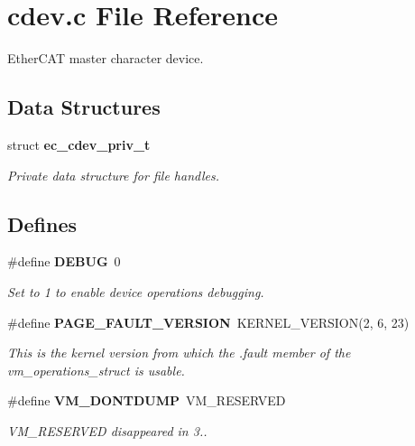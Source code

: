 \section{cdev.\-c \-File \-Reference}
\label{cdev_8c}


\-Ether\-C\-A\-T master character device.  


\subsection*{\-Data \-Structures}
\begin{DoxyCompactItemize}
\item 
struct {\bf ec\-\_\-cdev\-\_\-priv\-\_\-t}
\begin{DoxyCompactList}\small\item\em \-Private data structure for file handles. \end{DoxyCompactList}\end{DoxyCompactItemize}
\subsection*{\-Defines}
\begin{DoxyCompactItemize}
\item 
\#define {\bf \-D\-E\-B\-U\-G}~0\label{cdev_8c_ad72dbcf6d0153db1b8d8a58001feed83}

\begin{DoxyCompactList}\small\item\em \-Set to 1 to enable device operations debugging. \end{DoxyCompactList}\item 
\#define {\bf \-P\-A\-G\-E\-\_\-\-F\-A\-U\-L\-T\-\_\-\-V\-E\-R\-S\-I\-O\-N}~\-K\-E\-R\-N\-E\-L\-\_\-\-V\-E\-R\-S\-I\-O\-N(2, 6, 23)\label{cdev_8c_a10f95a3683dceea630bcdd04e89e484f}

\begin{DoxyCompactList}\small\item\em \-This is the kernel version from which the .fault member of the vm\-\_\-operations\-\_\-struct is usable. \end{DoxyCompactList}\item 
\#define {\bf \-V\-M\-\_\-\-D\-O\-N\-T\-D\-U\-M\-P}~\-V\-M\-\_\-\-R\-E\-S\-E\-R\-V\-E\-D\label{cdev_8c_a17f0ec31019517ccc93149007ee45d9d}

\begin{DoxyCompactList}\small\item\em \-V\-M\-\_\-\-R\-E\-S\-E\-R\-V\-E\-D disappeared in 3.. \end{DoxyCompactList}\end{DoxyCompactItemize}
